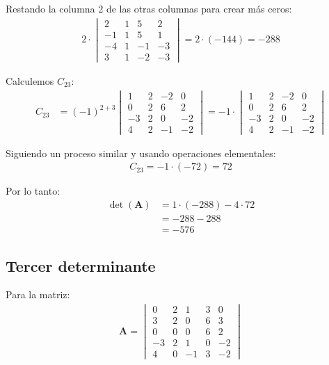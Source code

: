 \documentclass{report} %
\begin{document}
Restando la columna 2 de las otras columnas para crear más ceros:
\begin{align*}
2 \cdot \begin{vmatrix}
2 & 1 & 5 & 2 \\
-1 & 1 & 5 & 1 \\
-4 & 1 & -1 & -3 \\
3 & 1 & -2 & -3
\end{vmatrix} = 2 \cdot (-144) = -288
\end{align*}

Calculemos $C_{23}$:
\begin{align*}
C_{23} &= (-1)^{2+3} \begin{vmatrix}
1 & 2 & -2 & 0 \\
0 & 2 & 6 & 2 \\
-3 & 2 & 0 & -2 \\
4 & 2 & -1 & -2
\end{vmatrix} = -1 \cdot \begin{vmatrix}
1 & 2 & -2 & 0 \\
0 & 2 & 6 & 2 \\
-3 & 2 & 0 & -2 \\
4 & 2 & -1 & -2
\end{vmatrix}
\end{align*}

Siguiendo un proceso similar y usando operaciones elementales:
\begin{align*}
C_{23} = -1 \cdot (-72) = 72
\end{align*}

Por lo tanto:
\begin{align*}
\det(\mathbf{A}) &= 1 \cdot (-288) - 4 \cdot 72 \\
&= -288 - 288 \\
&= -576
\end{align*}

\subsection*{Tercer determinante}
Para la matriz:
\begin{align*}
\mathbf{A} = \begin{vmatrix}
0 & 2 & 1 & 3 & 0 \\
3 & 2 & 0 & 6 & 3 \\
0 & 0 & 0 & 6 & 2 \\
-3 & 2 & 1 & 0 & -2 \\
4 & 0 & -1 & 3 & -2
\end{vmatrix}
\end{align*}
\end{document}
